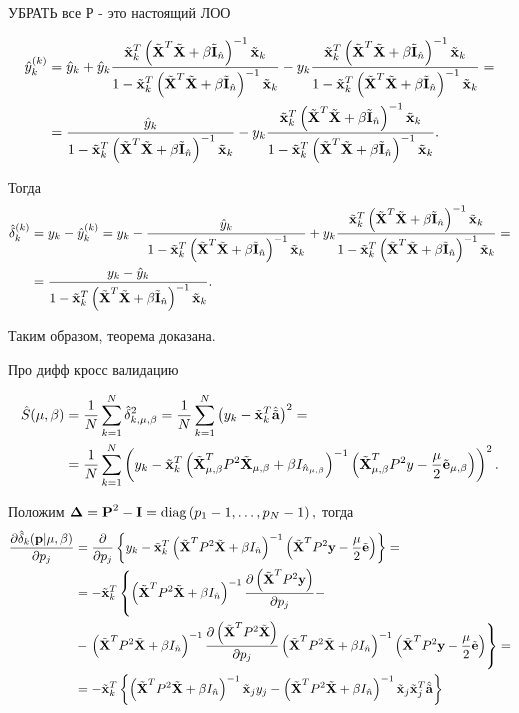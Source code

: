 УБРАТЬ все Р - это настоящий ЛОО

\begin{align}
	\hat y\this_k
		&= \hat y_k + \hat y_k\frac{\tilde{\mb x}_k^T\inv{\A} \tilde{\mb x}_k}{\denominator}
		- y_k\frac{\tilde{\mb x}^T_k\inv{\A}\tilde{\mb x}_k}{\denominator} = \\
		&= \frac{\hat y_k}{\denominator} - y_k\frac{\tilde{\mb x}^T_k\inv{\A}\tilde{\mb x}_k}{\denominator}.
\end{align}

Тогда
\begin{align}
	\hat{\delta}_k\this
	&= y_k - \hat y\this_k = y_k - \frac{\hat y_k}{\denominator} + y_k\frac{\tilde{\mb x}^T_k\inv{\A}\tilde{\mb x}_k}{\denominator} = \\
	&= \frac{y_k - \hat y_k}{\denominator}.
\end{align}

Таким образом, теорема доказана.


\begin{theorem}
Про дифф кросс валидацию
\end{theorem}

\begin{align}
	\hat S(\lams)
	&= \frac1N\suml_{k=1}^N\hat\delta_{k, \lams}^2
	= \frac1N\suml_{k=1}^N\cbr{y_k - \tilde {\mb x}_k^T \besta}^2 = \\
	&= \frac1N\suml_{k=1}^N
		\cbr{y_k - \tilde {\mb x}_k^T
		\inv{\tilde{\mb X}^T_\lams P^2\tilde{\mb X}_\lams + \beta I_{\hat n_\lams}}
		\cbr{\tilde{\mb X}^T_\lams P^2 y - \frac\mu2\tilde{\mb e}_\lams}
	}^2.
\end{align}

Положим $\mb \Delta = \mb P^2 - \mb I = \diag{p_1 - 1, \ldots, p_N - 1},$ тогда
\begin{align}
	\dd{\hat\delta_k(\mb p \cond \lams)}{p_j}
	&= 	\dd{}{p_j}
		\fbr{
			y_k - \tilde {\mb x}_k^T \inv{\tilde{\mb X}^T P^2\tilde{\mb X} + \beta I_{\hat n}}
			\cbr{\tilde{\mb X}^T P^2 \mb y -\frac\mu2\tilde{\mb e}}
		} = \\
	&= - \tilde {\mb x}_k^T
	\left\{
		\inv{\tilde{\mb X}^T P^2\tilde{\mb X} + \beta I_{\hat n}}
	  	\dd{\cbr{\tilde{\mb X}^T P^2 \mb y}}{p_j} -
	  	\right. \\
	&- 	\left.
	   	\inv{\tilde{\mb X}^T P^2\tilde{\mb X} + \beta I_{\hat n}}
		\dd{\cbr{\tilde{\mb X}^T P^2\tilde{\mb X}}}{p_j}
		\inv{\tilde{\mb X}^T P^2\tilde{\mb X} + \beta I_{\hat n}}
		\cbr{\tilde{\mb X}^T P^2 \mb y -\frac\mu2\tilde{\mb e}}
	\right\} = \\
	&= - \tilde {\mb x}_k^T
	\fbr{
		\inv{\tilde{\mb X}^T P^2\tilde{\mb X} + \beta I_{\hat n}}
		\tilde{\mb x}_jy_j
		-
		\inv{\tilde{\mb X}^T P^2\tilde{\mb X} + \beta I_{\hat n}}
		\tilde{\mb x}_j \tilde{\mb x}^T_j
		\besta
	}
\end{align}

